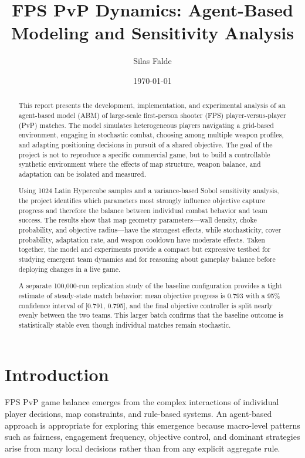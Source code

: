 \documentclass{assignment}
\title{FPS PvP Dynamics: Agent-Based Modeling and Sensitivity Analysis}
\author{Silas Falde}
\date{\today}
\begin{document}
\maketitle

\begin{abstract}
This report presents the development, implementation, and experimental analysis of an agent-based model (ABM) of large-scale first-person shooter (FPS) player-versus-player (PvP) matches. The model simulates heterogeneous players navigating a grid-based environment, engaging in stochastic combat, choosing among multiple weapon profiles, and adapting positioning decisions in pursuit of a shared objective. The goal of the project is not to reproduce a specific commercial game, but to build a controllable synthetic environment where the effects of map structure, weapon balance, and adaptation can be isolated and measured.

Using 1024 Latin Hypercube samples and a variance-based Sobol sensitivity analysis, the project identifies which parameters most strongly influence objective capture progress and therefore the balance between individual combat behavior and team success. The results show that map geometry parameters—wall density, choke probability, and objective radius—have the strongest effects, while stochasticity, cover probability, adaptation rate, and weapon cooldown have moderate effects. Taken together, the model and experiments provide a compact but expressive testbed for studying emergent team dynamics and for reasoning about gameplay balance before deploying changes in a live game.

A separate 100,000-run replication study of the baseline configuration provides a tight estimate of steady-state match behavior: mean objective progress is 0.793 with a 95\% confidence interval of [0.791, 0.795], and the final objective controller is split nearly evenly between the two teams. This larger batch confirms that the baseline outcome is statistically stable even though individual matches remain stochastic.
\end{abstract}

\section{Introduction}

FPS PvP game balance emerges from the complex interactions of individual player decisions, map constraints, and rule-based systems. An agent-based approach is appropriate for exploring this emergence because macro-level patterns such as fairness, engagement frequency, objective control, and dominant strategies arise from many local decisions rather than from any explicit aggregate rule.
\end{document}
